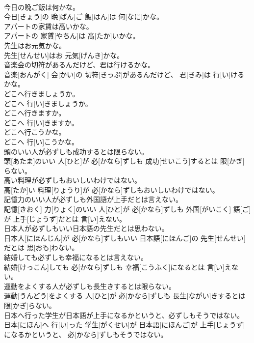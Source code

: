 \documentclass[8pt]{extreport}
\begin{document}
\begin{CJK}{UTF8}{min}
\\	今日の晩ご飯は何かな。	
\\	今日[きょう]の 晩[ばん]ご 飯[はん]は 何[なに]かな。
\\	アパートの家賃は高いかな。	
\\	アパートの 家賃[やちん]は 高[たか]いかな。
\\	先生はお元気かな。	
\\	先生[せんせい]はお 元気[げんき]かな。
\\	音楽会の切符があるんだけど、君は行けるかな。	
\\	音楽[おんがく] 会[かい]の 切符[きっぷ]があるんだけど、 君[きみ]は 行[い]けるかな。
\\	どこへ行きましょうか。	
\\	どこへ 行[い]きましょうか。
\\	どこへ行きますか。	
\\	どこへ 行[い]きますか。
\\	どこへ行こうかな。	
\\	どこへ 行[い]こうかな。
\\	頭のいい人が必ずしも成功するとは限らない。	
\\	頭[あたま]のいい 人[ひと]が 必[かなら]ずしも 成功[せいこう]するとは 限[かぎ]らない。
\\	高い料理が必ずしもおいしいわけではない。	
\\	高[たか]い 料理[りょうり]が 必[かなら]ずしもおいしいわけではない。
\\	記憶力のいい人が必ずしも外国語が上手だとは言えない。	
\\	記憶[きおく] 力[りょく]のいい 人[ひと]が 必[かなら]ずしも 外国[がいこく] 語[ご]が 上手[じょうず]だとは 言[い]えない。
\\	日本人が必ずしもいい日本語の先生だとは思わない。	
\\	日本人[にほんじん]が 必[かなら]ずしもいい 日本語[にほんご]の 先生[せんせい]だとは 思[おも]わない。
\\	結婚しても必ずしも幸福になるとは言えない。	
\\	結婚[けっこん]しても 必[かなら]ずしも 幸福[こうふく]になるとは 言[い]えない。
\\	運動をよくする人が必ずしも長生きするとは限らない。	
\\	運動[うんどう]をよくする 人[ひと]が 必[かなら]ずしも 長生[ながい]きするとは 限[かぎ]らない。
\\	日本へ行った学生が日本語が上手になるかというと、必ずしもそうではない。	
\\	日本[にほん]へ 行[い]った 学生[がくせい]が 日本語[にほんご]が 上手[じょうず]になるかというと、 必[かなら]ずしもそうではない。

\end{CJK}
\end{document}
